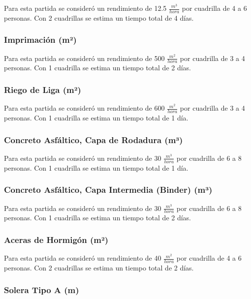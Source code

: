 \documentclass{article} %
\begin{document}
Para esta partida se consideró un rendimiento de 12.5 $\frac{m^3}{hora}$ por cuadrilla de 4 a 6 personas. Con 2 cuadrillas se estima un tiempo total de 4 días.

\subsubsection{Imprimación (m²)}

Para esta partida se consideró un rendimiento de 500 $\frac{m^2}{hora}$ por cuadrilla de 3 a 4 personas. Con 1 cuadrilla se estima un tiempo total de 2 días.

\subsubsection{Riego de Liga (m²)}

Para esta partida se consideró un rendimiento de 600 $\frac{m^2}{hora}$ por cuadrilla de 3 a 4 personas. Con 1 cuadrilla se estima un tiempo total de 1 día.

\subsubsection{Concreto Asfáltico, Capa de Rodadura (m³)}

Para esta partida se consideró un rendimiento de 30 $\frac{m^3}{hora}$ por cuadrilla de 6 a 8 personas. Con 1 cuadrilla se estima un tiempo total de 1 día.

\subsubsection{Concreto Asfáltico, Capa Intermedia (Binder) (m³)}

Para esta partida se consideró un rendimiento de 30 $\frac{m^3}{hora}$ por cuadrilla de 6 a 8 personas. Con 1 cuadrilla se estima un tiempo total de 2 días.

\subsubsection{Aceras de Hormigón (m²)}

Para esta partida se consideró un rendimiento de 40 $\frac{m^2}{hora}$ por cuadrilla de 4 a 6 personas. Con 2 cuadrillas se estima un tiempo total de 2 días.

\subsubsection{Solera Tipo A (m)}
\end{document}
